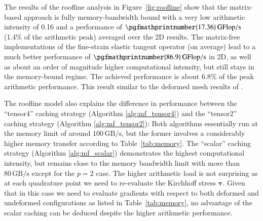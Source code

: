 \documentclass[AMA,STIX1COL]{WileyNJD-v2}
\newcommand*{\gz}[1]{\boldsymbol{#1}}
\begin{document}
The results of the roofline analysis in Figure~\ref{fig:roofline} show that the matrix-based approach is fully memory-bandwidth bound with a very low arithmetic intensity of 0.16 and a performance of $\pgfmathprintnumber{17.36}\,\rm{GFlop/s}$ (1.4\% of the arithmetic peak) averaged over the 2D results.
{\color{red}
The matrix-free implementations of the fine-strain elastic tangent operator (on average) lead to a much better performance of
$\pgfmathprintnumber{86.9}\,\rm{GFlop/s}$ in 2D, as well as about an order of magnitude higher computational intensity, but still stays in the memory-bound regime.
The achieved performance is about 6.8\% of the peak arithmetic performance. This result similar to the deformed mesh results of \cite[Figure 18]{kronbichler2017fast}.
}

{\color{red}
The roofline model also explains the difference in performance between the ``tensor4'' caching strategy (Algorithm \ref{alg:mf_tensor4}) and the ``tensor2'' caching strategy (Algorithm \ref{alg:mf_tensor2}): Both algorithms essentially run at the memory limit of around $100\, \text{GB/s}$, but the former involves a considerably higher memory transfer according to Table~\ref{tab:memory}.
The ``scalar'' caching strategy (Algorithm \ref{alg:mf_scalar}) demonstrates the highest computational intensity, but remains close to the memory bandwidth limit with more than $80\, \text{GB/s}$ except for the $p=2$ case. The higher arithmetic load is not surprising as at each quadrature point we need to re-evaluate the Kirchhoff stress $\gz \tau$.
Given that in this case we need to evaluate gradients with respect to both deformed and undeformed configurations as listed in Table~\ref{tab:memory}, no advantage of the scalar caching can be deduced despite the higher arithmetic performance.
}
\end{document}
